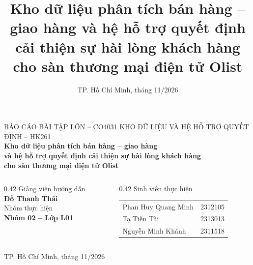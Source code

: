 \documentclass[aspectratio=169,10pt,xcolor=table]{beamer}
\title{Kho dữ liệu phân tích bán hàng – giao hàng và hệ hỗ trợ quyết định cải thiện sự hài lòng khách hàng cho sàn thương mại điện tử Olist}
\date{TP. Hồ Chí Minh, tháng 11/2026}
\begin{document}
\begin{frame}
  \vspace{1.2cm}
  \begin{center}
    {\footnotesize\color{muted} BÁO CÁO BÀI TẬP LỚN -- CO4031 KHO DỮ LIỆU VÀ HỆ HỖ TRỢ QUYẾT ĐỊNH -- HK261}\\[0.5cm]
    {\Large\bfseries\color{bkblue}
     Kho dữ liệu phân tích bán hàng -- giao hàng\\[0.15cm]
     và hệ hỗ trợ quyết định cải thiện sự hài lòng khách hàng\\[0.15cm]
     cho sàn thương mại điện tử Olist}\\[0.6cm]
  \end{center}
  \begin{columns}[T]
    \begin{column}{0.42\textwidth}
      \small
      \textcolor{muted}{Giảng viên hướng dẫn}\\
      \textbf{Đỗ Thanh Thái}\\[0.3cm]
      \textcolor{muted}{Nhóm thực hiện}\\
      \textbf{Nhóm 02 -- Lớp L01}
    \end{column}
    \begin{column}{0.42\textwidth}
      \small
      \textcolor{muted}{Sinh viên thực hiện}\\[0.1cm]
      \begin{tabular}{@{}l@{\quad}r@{}}
        Phan Huy Quang Minh & 2312105\\
        Tạ Tiến Tài         & 2313013\\
        Nguyễn Minh Khánh   & 2311518\\
      \end{tabular}
    \end{column}
  \end{columns}
  \vfill
  \begin{center}\scriptsize\color{muted}TP. Hồ Chí Minh, tháng 11/2026\end{center}
\end{frame}
\end{document}
